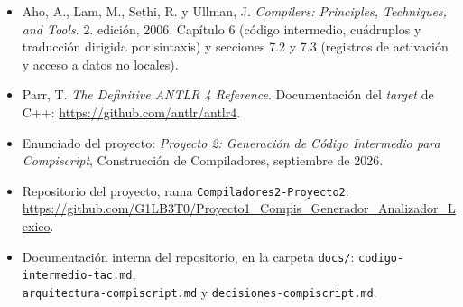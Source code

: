 \documentclass[11pt,a4paper]{article}
\begin{document}
\begin{itemize}[leftmargin=1.4em]
  \item Aho, A., Lam, M., Sethi, R. y Ullman, J. \emph{Compilers: Principles,
        Techniques, and Tools}. 2.\textordfeminine{} edición, 2006. Capítulo 6
        (código intermedio, cuádruplos y traducción dirigida por sintaxis) y
        secciones 7.2 y 7.3 (registros de activación y acceso a datos no
        locales).
  \item Parr, T. \emph{The Definitive ANTLR 4 Reference}. Documentación del
        \emph{target} de C++: \url{https://github.com/antlr/antlr4}.
  \item Enunciado del proyecto: \emph{Proyecto 2: Generación de Código
        Intermedio para Compiscript}, Construcción de Compiladores, septiembre
        de 2026.
  \item Repositorio del proyecto, rama \texttt{Compiladores2-Proyecto2}:
        \url{https://github.com/G1LB3T0/Proyecto1_Compis_Generador_Analizador_Lexico}.
  \item Documentación interna del repositorio, en la carpeta \texttt{docs/}:
        \texttt{codigo-intermedio-tac.md}, \\
        \texttt{arquitectura-compiscript.md} y
        \texttt{decisiones-compiscript.md}.
\end{itemize}
\end{document}
